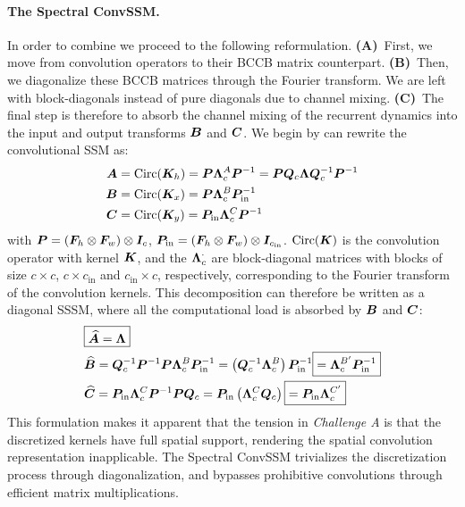 \documentclass{article}
\begin{document}
\paragraph{The Spectral ConvSSM.} In order to combine  we proceed to the following reformulation. \textbf{(A)}~First, we move from convolution operators to their BCCB matrix counterpart. \textbf{(B)}~Then, we diagonalize these BCCB matrices through the Fourier transform. We are left with block-diagonals instead of pure diagonals due to channel mixing. \textbf{(C)}~The final step is therefore to absorb the channel mixing of the recurrent dynamics into the input and output transforms $\bm{B}$ and $\bm{C}$. We begin by can rewrite the convolutional SSM as:
%
\begin{align}
\label{eq:convssm:A}
\bm{A} &= \mathrm{Circ}(\bm{K}_h) = \bm{P} \bm{\Lambda}^A_c \bm{P}^{-1} = \bm{P} \bm{Q}_c \bm{\Lambda} \bm{Q}_c^{-1} \bm{P}^{-1} \\
\label{eq:convssm:B}
\bm{B} &= \mathrm{Circ}(\bm{K}_x) = \bm{P} \bm{\Lambda}^B_c \bm{P}_{\mathrm{in}}^{-1} \\
\label{eq:convssm:C}
\bm{C} &= \mathrm{Circ}(\bm{K}_y) = \bm{P}_{\mathrm{in}} \bm{\Lambda}^C_c \bm{P}^{-1}
\end{align}
%
with $\bm{P} = (\bm{F}_h \otimes \bm{F}_w) \otimes \bm{I}_c$, $\bm{P}_{\mathrm{in}} = (\bm{F}_h \otimes \bm{F}_w) \otimes \bm{I}_{c_\mathrm{in}}$. $\mathrm{Circ}(\bm{K})$ is the convolution operator with kernel $\bm{K}$, and the $\bm{\Lambda}^{\cdot}_c$ are block-diagonal matrices with blocks of size $c \!\times\! c$, $c \!\times\! c_\mathrm{in}$ and $c_\mathrm{in} \!\times\! c$, respectively, corresponding to the Fourier transform of the convolution kernels.
%
This decomposition can therefore be written as a diagonal SSSM, where all the computational load is absorbed by $\bm{B}$ and $\bm{C}$:
\begin{align}
\label{eq:convssm}
&\boxed{\widehat{\bm{A}} = \bm{\Lambda}} \\
&\widehat{\bm{B}} = \bm{Q}_c^{-1} \bm{P}^{-1} \bm{P} \bm{\Lambda}^B_c \bm{P}_{\mathrm{in}}^{-1} = \left(\bm{Q}_c^{-1} \bm{\Lambda}^B_c\right) \bm{P}_{\mathrm{in}}^{-1} \boxed{= \bm{\Lambda}^{B'}_c \bm{P}_{\mathrm{in}}^{-1}} \\
&\widehat{\bm{C}} = \bm{P}_{\mathrm{in}} \bm{\Lambda}^C_c \bm{P}^{-1} \bm{P} \bm{Q}_c = \bm{P}_{\mathrm{in}} \left(\bm{\Lambda}^C_c \bm{Q}_c\right) \boxed{= \bm{P}_{\mathrm{in}} \bm{\Lambda}^{C'}_c}
\end{align}
This formulation makes it apparent that the tension in \emph{Challenge A} is that the discretized kernels have full spatial support, rendering the spatial convolution representation inapplicable. The Spectral ConvSSM trivializes the discretization process through diagonalization, and bypasses prohibitive convolutions through efficient matrix multiplications.
\end{document}
